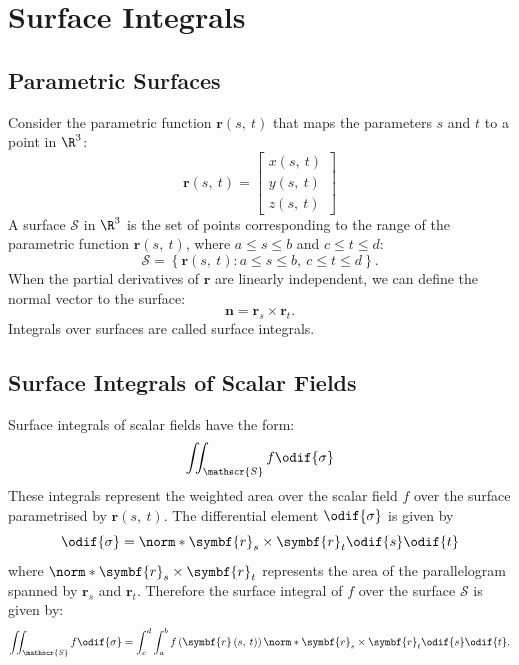 \documentclass{article}
\begin{document}
\section{Surface Integrals}
\subsection{Parametric Surfaces}
Consider the parametric function \(\symbf{r}\left( s,\: t \right)\) that
maps the parameters \(s\) and \(t\) to a point in \(\R^3\):
\begin{equation*}
    \symbf{r}\left( s,\: t \right) = \begin{bmatrix}
        x\left( s,\: t \right) \\
        y\left( s,\: t \right) \\
        z\left( s,\: t \right)
    \end{bmatrix}
\end{equation*}
A surface \(\mathscr{S}\) in \(\R^3\) is the set of points corresponding
to the range of the parametric function \(\symbf{r}\left( s,\: t \right)\),
where \(a \leqslant s \leqslant b\) and \(c \leqslant t \leqslant d\):
\begin{equation*}
    \mathscr{S} = \left\{ \symbf{r}\left( s,\: t \right) : a \leqslant s \leqslant b, \: c \leqslant t \leqslant d \right\}.
\end{equation*}
When the partial derivatives of \(\symbf{r}\) are linearly independent,
we can define the normal vector to the surface:
\begin{equation*}
    \symbf{n} = \symbf{r}_s \times \symbf{r}_t.
\end{equation*}
Integrals over surfaces are called surface integrals.
\subsection{Surface Integrals of Scalar Fields}
Surface integrals of scalar fields have the form:
\begin{equation*}
    \iint_{\mathscr{S}} f \odif{\sigma}
\end{equation*}
These integrals represent the weighted area over the scalar field \(f\)
over the surface parametrised by \(\symbf{r}\left( s,\: t \right)\).
The differential element \(\odif{\sigma}\) is given by
\begin{equation*}
    \odif{\sigma} = \norm*{\symbf{r}_s \times \symbf{r}_t} \odif{s} \odif{t}
\end{equation*}
where \(\norm*{\symbf{r}_s \times \symbf{r}_t}\) represents the area of
the parallelogram spanned by \(\symbf{r}_s\) and \(\symbf{r}_t\).
Therefore the surface integral of \(f\) over the surface \(\mathscr{S}\)
is given by:
\begin{equation*}
    \iint_{\mathscr{S}} f \odif{\sigma} = \int_c^d \int_a^b f\left( \symbf{r}\left( s,\: t \right) \right) \norm*{\symbf{r}_s \times \symbf{r}_t} \odif{s} \odif{t}.
\end{equation*}
\end{document}
